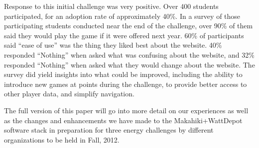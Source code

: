 \documentclass{acm_proc_article-sp}
\begin{document}
Response to this initial challenge was very positive.   Over 400 students participated,
for an adoption rate of approximately 40\%.  In a survey of those participating students
conducted near the end of the challenge, over 90\% of them said they would play the game
if it were offered next year.  60\% of participants said ``ease of use'' was the thing they
liked best about the website.  40\% responded ``Nothing'' when asked what was
confusing about the website, and 32\% responded ``Nothing'' when asked what they would
change about the website.  The survey did yield insights into what could be improved,
including the ability to introduce new games at points during the challenge, to provide
better access to other player data, and simplify navigation. 

The full version of this paper will go into more detail on our experiences as well as the
changes and enhancements we have made to the Makahiki+WattDepot software stack in
preparation for three energy challenges by different organizations to be held in Fall, 2012.



\end{document}

